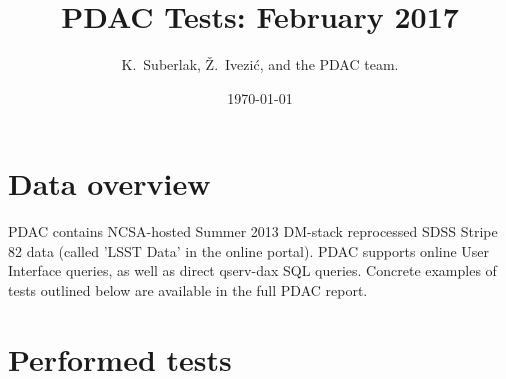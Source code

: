 \documentclass[DM,lsstdraft,toc,usenatbib]{lsstdoc}
\title[PDAC progress]{PDAC Tests: February 2017}
\author{
K.~Suberlak,
\v{Z}.~Ivezi\'c,
and the PDAC team.}
\date{\today}
\begin{document}
\maketitle

\section{Data overview}

PDAC contains NCSA-hosted Summer 2013 DM-stack reprocessed SDSS Stripe 82 data (called 'LSST Data' in the online portal). PDAC supports online User Interface queries, as well as direct  qserv-dax SQL queries. Concrete examples of tests outlined below are available in the full PDAC report.  


\section{Performed tests}
\end{document}
